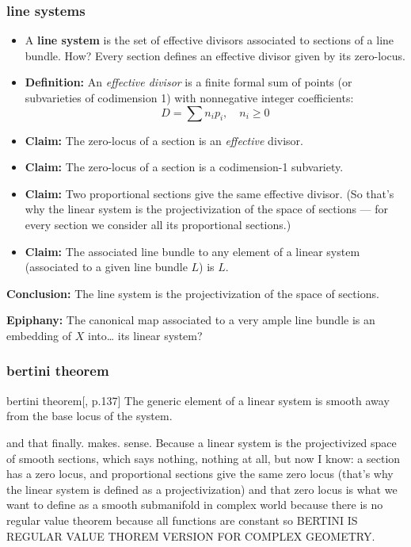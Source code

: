 \subsubsection{line systems}
\begin{itemize}
  \item A \textbf{line system} is the set of effective divisors associated to sections of a line bundle. How? Every section defines an effective divisor given by its zero-locus.
  
  \item \textbf{Definition:} An \emph{effective divisor} is a finite formal sum of points (or subvarieties of codimension 1) with nonnegative integer coefficients:
  \[
  D = \sum n_i p_i, \quad n_i \geq 0
  \]
  
  \item \textbf{Claim:} The zero-locus of a section is an \emph{effective} divisor.
\item \textbf{Claim:} The zero-locus of a section is a codimension-1 subvariety. 

  \item \textbf{Claim:} Two proportional sections give the same effective divisor. (So that's why the linear system is the projectivization of the space of sections — for every section we consider all its proportional sections.)
\item \textbf{Claim:} The associated line bundle to any element of a linear system (associated to a given line bundle \(L\)) is \(L\). 
\end{itemize}

\textbf{Conclusion:} The line system is the projectivization of the space of sections.

\textbf{Epiphany:} The canonical map associated to a very ample line bundle is an embedding of \( X \) into… its linear system?
\subsubsection{bertini theorem}

\begin{thing6}{bertini theorem}[\cite{gri}, p.137]\leavevmode
The generic element of a linear system is smooth away from the base locus of the system.
\end{thing6}

and that finally. makes. sense. Because a linear system is the projectivized space of smooth sections, which says nothing, nothing at all, but now I know: a section has a zero locus, and proportional sections give the same zero locus (that's why the linear system is defined as a projectivization) and that zero locus is what we want to define as a smooth submanifold in complex world because there is no regular value theorem because all functions are constant so BERTINI IS REGULAR VALUE THOREM VERSION FOR COMPLEX GEOMETRY.

